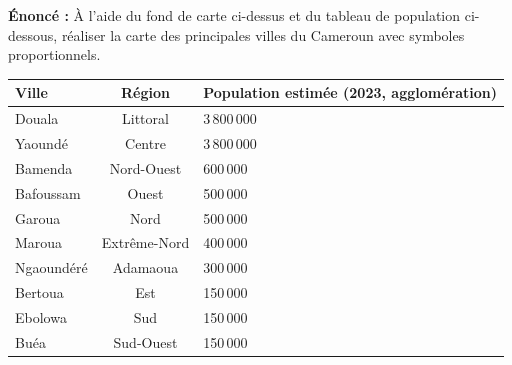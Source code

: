 \documentclass[11pt]{article}
\begin{document}
\begin{exoresolu}
\textbf{Énoncé :} À l'aide du fond de carte ci-dessus et du tableau de population ci-dessous, réaliser la carte des principales villes du Cameroun avec symboles proportionnels.

\begin{center}
\begin{tabularx}{\linewidth}{|l|c|X|}\hline
\textbf{Ville} & \textbf{Région} & \textbf{Population estimée (2023, agglomération)} \\ \hline
Douala & Littoral & 3\,800\,000 \\ \hline
Yaoundé & Centre & 3\,800\,000 \\ \hline
Bamenda & Nord-Ouest & 600\,000 \\ \hline
Bafoussam & Ouest & 500\,000 \\ \hline
Garoua & Nord & 500\,000 \\ \hline
Maroua & Extrême-Nord & 400\,000 \\ \hline
Ngaoundéré & Adamaoua & 300\,000 \\ \hline
Bertoua & Est & 150\,000 \\ \hline
Ebolowa & Sud & 150\,000 \\ \hline
Buéa & Sud-Ouest & 150\,000 \\ \hline
\end{tabularx}
\end{center}

\tcblower


\end{exoresolu}
\end{document}
